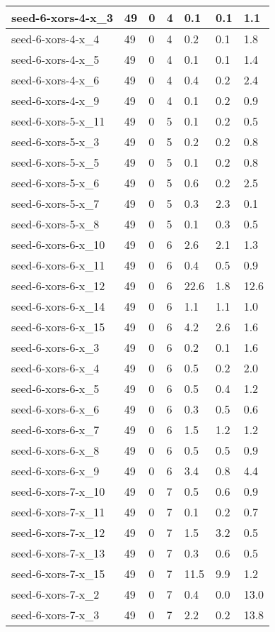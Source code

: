 \begin{scriptsize}
\begin{longtable}{|p{5cm}|l|l|l|l|l|l|}
seed-6-xors-4-x\_3&49&0&4&0.1&0.1&1.1 \\ \hline 
seed-6-xors-4-x\_4&49&0&4&0.2&0.1&1.8 \\ \hline 
seed-6-xors-4-x\_5&49&0&4&0.1&0.1&1.4 \\ \hline 
seed-6-xors-4-x\_6&49&0&4&0.4&0.2&2.4 \\ \hline 
seed-6-xors-4-x\_9&49&0&4&0.1&0.2&0.9 \\ \hline 
seed-6-xors-5-x\_11&49&0&5&0.1&0.2&0.5 \\ \hline 
seed-6-xors-5-x\_3&49&0&5&0.2&0.2&0.8 \\ \hline 
seed-6-xors-5-x\_5&49&0&5&0.1&0.2&0.8 \\ \hline 
seed-6-xors-5-x\_6&49&0&5&0.6&0.2&2.5 \\ \hline 
seed-6-xors-5-x\_7&49&0&5&0.3&2.3&0.1 \\ \hline 
seed-6-xors-5-x\_8&49&0&5&0.1&0.3&0.5 \\ \hline 
seed-6-xors-6-x\_10&49&0&6&2.6&2.1&1.3 \\ \hline 
seed-6-xors-6-x\_11&49&0&6&0.4&0.5&0.9 \\ \hline 
seed-6-xors-6-x\_12&49&0&6&22.6&1.8&12.6 \\ \hline 
seed-6-xors-6-x\_14&49&0&6&1.1&1.1&1.0 \\ \hline 
seed-6-xors-6-x\_15&49&0&6&4.2&2.6&1.6 \\ \hline 
seed-6-xors-6-x\_3&49&0&6&0.2&0.1&1.6 \\ \hline 
seed-6-xors-6-x\_4&49&0&6&0.5&0.2&2.0 \\ \hline 
seed-6-xors-6-x\_5&49&0&6&0.5&0.4&1.2 \\ \hline 
seed-6-xors-6-x\_6&49&0&6&0.3&0.5&0.6 \\ \hline 
seed-6-xors-6-x\_7&49&0&6&1.5&1.2&1.2 \\ \hline 
seed-6-xors-6-x\_8&49&0&6&0.5&0.5&0.9 \\ \hline 
seed-6-xors-6-x\_9&49&0&6&3.4&0.8&4.4 \\ \hline 
seed-6-xors-7-x\_10&49&0&7&0.5&0.6&0.9 \\ \hline 
seed-6-xors-7-x\_11&49&0&7&0.1&0.2&0.7 \\ \hline 
seed-6-xors-7-x\_12&49&0&7&1.5&3.2&0.5 \\ \hline 
seed-6-xors-7-x\_13&49&0&7&0.3&0.6&0.5 \\ \hline 
seed-6-xors-7-x\_15&49&0&7&11.5&9.9&1.2 \\ \hline 
seed-6-xors-7-x\_2&49&0&7&0.4&0.0&13.0 \\ \hline 
seed-6-xors-7-x\_3&49&0&7&2.2&0.2&13.8 \\ \hline 

\end{longtable}
\end{scriptsize}
